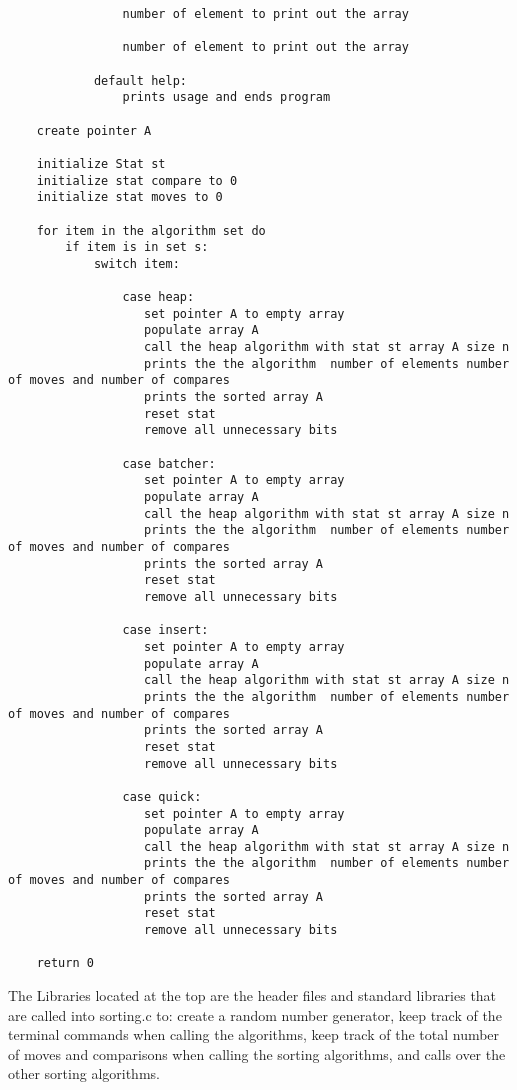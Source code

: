\documentclass[11pt]{article} %
\begin{document}
\begin{flushleft}
\begin{lstlisting}
                number of element to print out the array

                number of element to print out the array

            default help:
                prints usage and ends program

    create pointer A

    initialize Stat st
    initialize stat compare to 0
    initialize stat moves to 0

    for item in the algorithm set do
        if item is in set s:
            switch item:

                case heap:
                   set pointer A to empty array
                   populate array A
                   call the heap algorithm with stat st array A size n 
                   prints the the algorithm  number of elements number of moves and number of compares
                   prints the sorted array A
                   reset stat
                   remove all unnecessary bits

                case batcher:
                   set pointer A to empty array
                   populate array A
                   call the heap algorithm with stat st array A size n 
                   prints the the algorithm  number of elements number of moves and number of compares
                   prints the sorted array A
                   reset stat
                   remove all unnecessary bits

                case insert:
                   set pointer A to empty array
                   populate array A
                   call the heap algorithm with stat st array A size n 
                   prints the the algorithm  number of elements number of moves and number of compares
                   prints the sorted array A
                   reset stat
                   remove all unnecessary bits

                case quick:
                   set pointer A to empty array
                   populate array A
                   call the heap algorithm with stat st array A size n 
                   prints the the algorithm  number of elements number of moves and number of compares
                   prints the sorted array A
                   reset stat
                   remove all unnecessary bits

    return 0
\end{lstlisting}

The Libraries located at the top are the header files and standard libraries that are called into sorting.c to: create a random number generator, keep track of the terminal commands when calling the algorithms,  keep track of the total number of moves and comparisons when calling the sorting algorithms, and calls over the other sorting algorithms. 


\end{flushleft}
\end{document}
